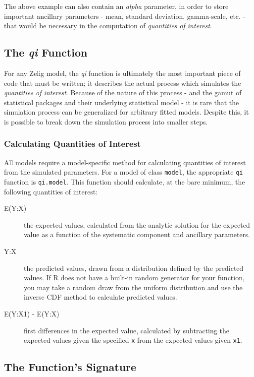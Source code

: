 The above example can also contain an \emph{alpha} parameter, in order to store important ancillary parameters - mean, standard deviation, gamma-scale, etc. - that would be necessary in the computation of \emph{quantities of interest}.


\subsection{The \emph{qi} Function}

For any Zelig model, the \emph{qi} function is ultimately the most important piece of code that must be written; it describes the actual process which simulates the \emph{quantities of interest}.  Because of the nature of this process - and the gamut of statistical packages and their underlying statistical model - it is rare that the simulation process can be generalized for arbitrary fitted models.  Despite this, it is possible to break down the simulation process into smaller steps.

\subsubsection{Calculating Quantities of Interest}
All models require a model-specific method for calculating quantities of interest from the simulated parameters. For a model of class {\tt model}, the appropriate {\tt qi} function is {\tt qi.model}. This function should calculate, at the bare minimum, the following quantities of interest:

\begin{description}
	\item[E(Y:X)]{the expected values, calculated from the analytic solution for the expected value as a function of the systematic component and ancillary parameters.}
	\item[Y:X]{the predicted values, drawn from a distribution defined by the predicted values. If R does not have a built-in random generator for your function, you may take a random draw from the uniform distribution and use the inverse CDF method to calculate predicted values.}
	\item[E(Y:X1) - E(Y:X)]{first differences in the expected value, calculated by subtracting the expected values given the specified {\tt x} from the expected values given {\tt x1}.}
\end{description}


\subsection{The Function's Signature}


